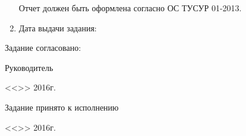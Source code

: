 \begin{enumerate}
Отчет должен быть оформлена согласно ОС ТУСУР 01-2013.
	
	\item Дата выдачи задания: \underline{\hspace{8cm}}

\end{enumerate}

Задание согласовано:

Руководитель

\underline{\hspace{10cm}}

<<\underline{\hspace{1cm}}>>\underline{\hspace{3cm}} 2016г.
\underline{\hspace{4cm}}

Задание принято к исполнению

<<\underline{\hspace{1cm}}>>\underline{\hspace{3cm}} 2016г.
\underline{\hspace{4cm}}